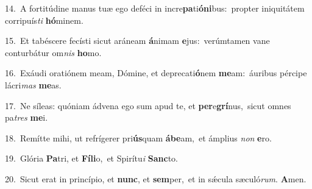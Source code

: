 {\numbfont\textcolor{\numbcolor}{14.}}~A fortitúdine manus tuæ ego deféci in incre\-\textbf{pa}\-ti\-\textbf{ó}\-\textbf{ni}bus:~\star propter iniquitátem corripuís\textit{ti} \textbf{hó}\-minem.\par
{\numbfont\textcolor{\numbcolor}{15.}}~Et tabéscere fecísti sicut aráneam \textbf{á}\-nimam \textbf{e}\-jus:~\star verúmtamen vane conturbátur om\textit{nis} \textbf{ho}\-mo.\par
{\numbfont\textcolor{\numbcolor}{16.}}~Exáudi oratiónem meam, Dómine, et deprecati\-\textbf{ó}\-nem \textbf{me}\-am:~\star áuribus pércipe lácri\textit{mas} \textbf{me}\-as.\par
{\numbfont\textcolor{\numbcolor}{17.}}~Ne síleas: quóniam ádvena ego sum apud te, et \textbf{per}\-e\-\textbf{grí}\-nus,~\star sicut omnes pa\textit{tres} \textbf{me}\-i.\par
{\numbfont\textcolor{\numbcolor}{18.}}~Remítte mihi, ut refrígerer pri\-\textbf{ús}\-quam \textbf{á}\-\textbf{be}am,~\star et ámplius \textit{non} \textbf{e}\-ro.\par
{\numbfont\textcolor{\numbcolor}{19.}}~Glória \textbf{Pa}\-tri, et \textbf{Fí}\-\textbf{li}o,~\star et Spirítu\textit{i} \textbf{Sanc}\-to.\par
{\numbfont\textcolor{\numbcolor}{20.}}~Sicut erat in princípio, et \textbf{nunc}\-, et \textbf{sem}\-per,~\star et in sǽcula sæculó\-\textit{rum}\-. \textbf{A}\-men.\par

